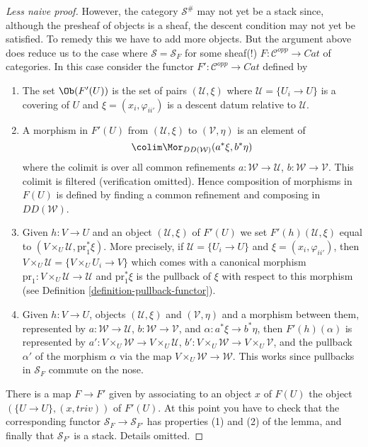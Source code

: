 \begin{proof}[Less naive proof]
\medskip\noindent
However, the category $\mathcal{S}^\#$ may not yet be a
stack since, although the presheaf of objects is a sheaf,
the descent condition may not yet be satisfied.
To remedy this we have to add more objects. But the argument
above does reduce us to the case where $\mathcal{S} = \mathcal{S}_F$
for some sheaf(!) $F : \mathcal{C}^{opp} \to \textit{Cat}$ of
categories. In this case consider the functor
$F' : \mathcal{C}^{opp} \to \textit{Cat}$ defined by
\begin{enumerate}
\item The set $\Ob(F'(U))$ is the set of pairs
$(\mathcal{U}, \xi)$ where $\mathcal{U} = \{U_i \to U\}$
is a covering of $U$ and $\xi = (x_i, \varphi_{ii'})$ is
a descent datum relative to $\mathcal{U}$.
\item A morphism in $F'(U)$ from
$(\mathcal{U}, \xi)$ to $(\mathcal{V}, \eta)$
is an element of
$$
\colim \Mor_{DD(\mathcal{W})}(a^*\xi, b^*\eta)
$$
where the colimit is over all common refinements
$a : \mathcal{W} \to \mathcal{U}$, $b : \mathcal{W} \to \mathcal{V}$.
This colimit is filtered (verification omitted).
Hence composition of morphisms in $F(U)$ is defined by
finding a common refinement and composing in $DD(\mathcal{W})$.
\item Given $h : V \to U$ and an object
$(\mathcal{U}, \xi)$ of $F'(U)$ we set $F'(h)(\mathcal{U}, \xi)$
equal to $(V \times_U \mathcal{U}, \text{pr}_1^*\xi)$.
More precisely, if $\mathcal{U} = \{U_i \to U\}$
and $\xi = (x_i, \varphi_{ii'})$, then
$V \times_U \mathcal{U} = \{V \times_U U_i \to V\}$
which comes with a canonical morphism
$\text{pr}_1 : V \times_U \mathcal{U} \to \mathcal{U}$ and
$\text{pr}_1^*\xi$ is the pullback of $\xi$ with respect to
this morphism (see Definition \ref{definition-pullback-functor}).
\item Given $h : V \to U$, objects $(\mathcal{U}, \xi)$
and $(\mathcal{V}, \eta)$ and a morphism between them, represented by
$a : \mathcal{W} \to \mathcal{U}$, $b : \mathcal{W} \to \mathcal{V}$,
and $\alpha : a^*\xi \to b^*\eta$, then $F'(h)(\alpha)$ is
represented by
$a' : V \times_U\mathcal{W} \to V \times_U\mathcal{U}$,
$b' : V \times_U\mathcal{W} \to V \times_U\mathcal{V}$,
and the pullback $\alpha'$ of the morphism $\alpha$ via
the map $V \times_U \mathcal{W} \to \mathcal{W}$. This works
since pullbacks in $\mathcal{S}_F$ commute on the nose.
\end{enumerate}
There is a map $F \to F'$ given by associating to
an object $x$ of $F(U)$ the object $(\{U \to U\}, (x, triv))$ of
$F'(U)$. At this point you have to check that the corresponding
functor $\mathcal{S}_F \to \mathcal{S}_{F'}$ has properties (1)
and (2) of the lemma, and finally that $\mathcal{S}_{F'}$ is
a stack. Details omitted.
\end{proof}

